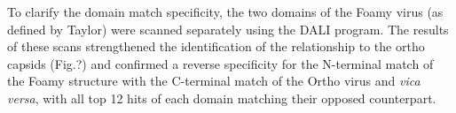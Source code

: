 To clarify the domain match specificity, the two domains of the Foamy virus (as defined by Taylor) 
were scanned separately using the DALI program.   The results of these scans strengthened the identification
of the relationship to the ortho capsids (Fig.?) and confirmed a reverse specificity for the N-terminal
match of the Foamy structure with the C-terminal match of the Ortho virus and {\em vica versa}, with all
top 12 hits of each domain matching their opposed counterpart.
%
% 
% 
